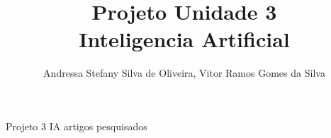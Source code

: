 \documentclass{article}
\title{Projeto Unidade 3\\Inteligencia Artificial\null\vfill}
\author{Andressa Stefany Silva de Oliveira, Vitor Ramos Gomes da Silva}
\begin{document}
	\maketitle
	\begin{titlepage}
	\end{titlepage}
	Projeto 3 IA artigos pesquisados \cite{DUMMY:1, DUMMY:2}
	
	
	
\end{document}
